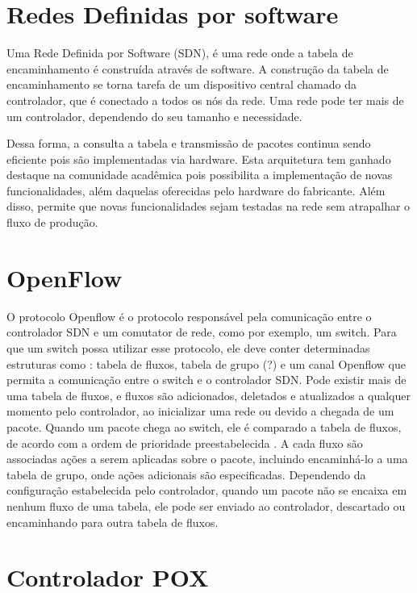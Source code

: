 \section{Redes Definidas por software}

Uma Rede Definida por Software (SDN), é uma rede onde a tabela de encaminhamento é construída através de software. A construção da tabela de encaminhamento se torna tarefa de um dispositivo central chamado da controlador, que é conectado a todos os nós da rede. Uma rede pode ter mais de um controlador, dependendo do seu tamanho e necessidade.

Dessa forma, a consulta a tabela e transmissão de pacotes continua sendo eficiente pois são implementadas via hardware. Esta arquitetura tem ganhado destaque na comunidade acadêmica pois possibilita a implementação de novas funcionalidades, além daquelas oferecidas pelo hardware do fabricante. Além disso, permite que novas funcionalidades sejam testadas na rede sem atrapalhar o fluxo de produção.

\section{OpenFlow}

O protocolo Openflow é o protocolo responsável pela comunicação entre o controlador SDN e um comutator de rede, como por exemplo, um switch. Para que um switch possa utilizar esse protocolo, ele deve conter determinadas estruturas como : tabela de fluxos, tabela de grupo (?) e um canal Openflow que permita a comunicação entre o switch e o controlador SDN. Pode existir mais de uma tabela de fluxos, e fluxos são adicionados, deletados e atualizados a qualquer momento pelo controlador, ao inicializar uma rede ou devido a chegada de um pacote. Quando um pacote chega ao switch, ele é comparado a tabela de fluxos, de acordo com a ordem de prioridade preestabelecida . A cada fluxo são associadas ações a serem aplicadas sobre o pacote, incluindo encaminhá-lo a uma tabela de grupo, onde ações adicionais são especificadas. Dependendo da configuração estabelecida pelo controlador, quando um pacote não se encaixa em nenhum fluxo de uma tabela, ele pode ser enviado ao controlador, descartado ou encaminhando para outra tabela de fluxos.\cite{Openflow}

\section{Controlador POX}


